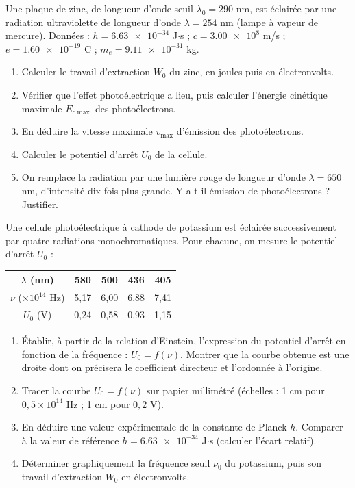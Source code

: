 \documentclass[11pt]{article}
\newcounter{popsec}
\newcounter{popsub}
\newcommand{\courssub}[1]{%
  \stepcounter{popsub}%
  \par\vspace{9pt}\noindent{\popxbold\fontsize{11.5}{13}\selectfont\color{popink}{\color{poporange}\thepopsec.\thepopsub}\hspace{6pt}#1}\par\nopagebreak\vspace{4pt}
}
\begin{document}
\courssub{Je m'entraîne}

\begin{exercice}
Une plaque de zinc, de longueur d'onde seuil $\lambda_0 = \num{290}$ nm, est éclairée par une radiation ultraviolette de longueur d'onde $\lambda = \num{254}$ nm (lampe à vapeur de mercure).
Données : $h = \num{6,63e-34}$ J$\cdot$s ; $c = \num{3,00e8}$ m/s ; $e = \num{1,60e-19}$ C ; $m_e = \num{9,11e-31}$ kg.
\begin{enumerate}
\item Calculer le travail d'extraction $W_0$ du zinc, en joules puis en électronvolts.
\item Vérifier que l'effet photoélectrique a lieu, puis calculer l'énergie cinétique maximale $E_{c\max}$ des photoélectrons.
\item En déduire la vitesse maximale $v_{\max}$ d'émission des photoélectrons.
\item Calculer le potentiel d'arrêt $U_0$ de la cellule.
\item On remplace la radiation par une lumière rouge de longueur d'onde $\lambda = \num{650}$ nm, d'intensité dix fois plus grande. Y a-t-il émission de photoélectrons ? Justifier.
\end{enumerate}
\end{exercice}

\begin{exercice}
Une cellule photoélectrique à cathode de potassium est éclairée successivement par quatre radiations monochromatiques. Pour chacune, on mesure le potentiel d'arrêt $U_0$ :
\begin{center}
\begin{tabular}{|c|c|c|c|c|}
\hline
\rowcolor{popblueL} $\lambda$ (nm) & 580 & 500 & 436 & 405 \\
\hline $\nu$ ($\times 10^{14}$ Hz) & 5,17 & 6,00 & 6,88 & 7,41 \\
\hline $U_0$ (V) & 0,24 & 0,58 & 0,93 & 1,15 \\
\hline
\end{tabular}
\end{center}
\begin{enumerate}
\item Établir, à partir de la relation d'Einstein, l'expression du potentiel d'arrêt en fonction de la fréquence : $U_0 = f(\nu)$. Montrer que la courbe obtenue est une droite dont on précisera le coefficient directeur et l'ordonnée à l'origine.
\item Tracer la courbe $U_0 = f(\nu)$ sur papier millimétré (échelles : 1 cm pour $0,5 \times 10^{14}$ Hz ; 1 cm pour $0,2$ V).
\item En déduire une valeur expérimentale de la constante de Planck $h$. Comparer à la valeur de référence $h = \num{6,63e-34}$ J$\cdot$s (calculer l'écart relatif).
\item Déterminer graphiquement la fréquence seuil $\nu_0$ du potassium, puis son travail d'extraction $W_0$ en électronvolts.
\end{enumerate}
\end{exercice}
\end{document}

